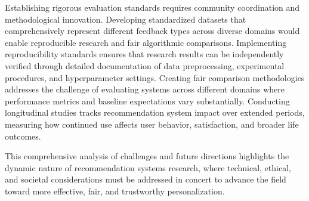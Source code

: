 Establishing rigorous evaluation standards requires community coordination and methodological innovation. Developing standardized datasets that comprehensively represent different feedback types across diverse domains would enable reproducible research and fair algorithmic comparisons. Implementing reproducibility standards ensures that research results can be independently verified through detailed documentation of data preprocessing, experimental procedures, and hyperparameter settings. Creating fair comparison methodologies addresses the challenge of evaluating systems across different domains where performance metrics and baseline expectations vary substantially. Conducting longitudinal studies tracks recommendation system impact over extended periods, measuring how continued use affects user behavior, satisfaction, and broader life outcomes.

This comprehensive analysis of challenges and future directions highlights the dynamic nature of recommendation systems research, where technical, ethical, and societal considerations must be addressed in concert to advance the field toward more effective, fair, and trustworthy personalization.
